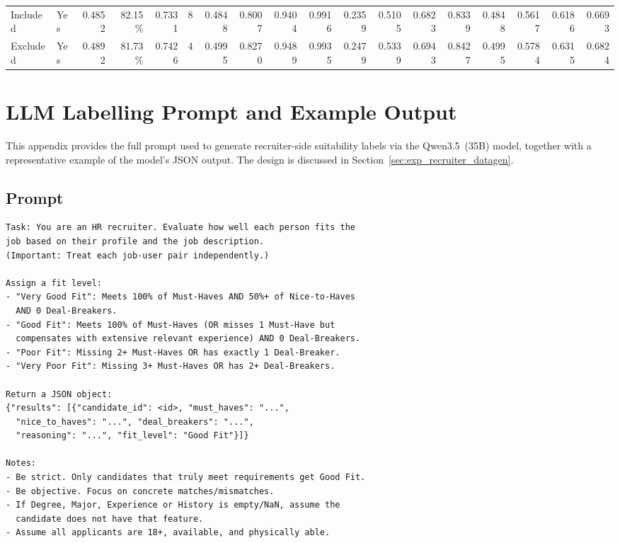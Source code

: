 \begin{appendices}
\begin{table}[htbp]
{\begin{tabular}{llrrrrrrrrrrrrrrrr}
        Included & Yes & 0.4852 & 82.15\% & 0.7331 & 8
            & 0.4848 & 0.8007 & 0.9404 & 0.9916
            & 0.2359 & 0.5105 & 0.6823 & 0.8339
            & 0.4848 & 0.5617 & 0.6186 & 0.6693 \\

        Excluded & Yes & 0.4892 & 81.73\% & 0.7426 & 4
            & 0.4995 & 0.8270 & 0.9489 & 0.9935
            & 0.2479 & 0.5339 & 0.6943 & 0.8427
            & 0.4995 & 0.5784 & 0.6315 & 0.6824 \\
        \bottomrule
    \end{tabular}}
\end{table}
\newpage
\section*{LLM Labelling Prompt and Example Output}
\label{app:llm_prompt}
This appendix provides the full prompt used to generate recruiter-side
suitability labels via the Qwen3.5~(35B) model, together with a
representative example of the model's JSON output. The design is discussed in
Section~\ref{sec:exp_recruiter_datagen}.

\subsection*{Prompt}

{\footnotesize
\begin{verbatim}
Task: You are an HR recruiter. Evaluate how well each person fits the
job based on their profile and the job description.
(Important: Treat each job-user pair independently.)

Assign a fit level:
- "Very Good Fit": Meets 100% of Must-Haves AND 50%+ of Nice-to-Haves
  AND 0 Deal-Breakers.
- "Good Fit": Meets 100% of Must-Haves (OR misses 1 Must-Have but
  compensates with extensive relevant experience) AND 0 Deal-Breakers.
- "Poor Fit": Missing 2+ Must-Haves OR has exactly 1 Deal-Breaker.
- "Very Poor Fit": Missing 3+ Must-Haves OR has 2+ Deal-Breakers.

Return a JSON object:
{"results": [{"candidate_id": <id>, "must_haves": "...",
  "nice_to_haves": "...", "deal_breakers": "...",
  "reasoning": "...", "fit_level": "Good Fit"}]}

Notes:
- Be strict. Only candidates that truly meet requirements get Good Fit.
- Be objective. Focus on concrete matches/mismatches.
- If Degree, Major, Experience or History is empty/NaN, assume the
  candidate does not have that feature.
- Assume all applicants are 18+, available, and physically able.


\end{verbatim}}
\end{appendices}
